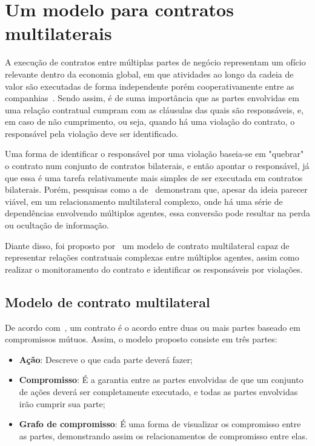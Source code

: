\section{Um modelo para contratos multilaterais} \label{sec:trab_contratos}

A execução de contratos entre múltiplas partes de negócio representam um ofício relevante dentro da economia global, em que atividades ao longo da cadeia de valor são executadas de forma independente porém cooperativamente entre as companhias~\cite{xu2004monitoring}. Sendo assim, é de suma importância que as partes envolvidas em uma relação contratual cumpram com as cláusulas das quais são responsáveis, e, em caso de não cumprimento, ou seja, quando há uma violação do contrato, o responsável pela violação deve ser identificado.

Uma forma de identificar o responsável por uma violação baseia-se em "quebrar" o contrato num conjunto de contratos bilaterais, e então apontar o responsável, já que essa é uma tarefa relativamente mais simples de ser executada em contratos bilaterais. Porém, pesquisas como a de~\citeauthor{haugen2002multi} demonstram que, apesar da ideia parecer viável, em um relacionamento multilateral complexo, onde há uma série de dependências envolvendo múltiplos agentes, essa conversão pode resultar na perda ou ocultação de informação.

Diante disso, foi proposto por~\citeauthor{xu2004multi} um modelo de contrato multilateral capaz de representar relações contratuais complexas entre múltiplos agentes, assim como realizar o monitoramento do contrato e identificar os responsáveis por violações.


\subsection*{Modelo de contrato multilateral}

De acordo com~\citeauthor{xu2004multi}, um contrato é o acordo entre duas ou mais partes baseado em compromissos mútuos. Assim, o modelo proposto consiste em três partes:
\begin{itemize}
	\item \textbf{Ação}: Descreve o que cada parte deverá fazer;
	\item \textbf{Compromisso}: É a garantia entre as partes envolvidas de que um conjunto de ações deverá ser completamente executado, e todas as partes envolvidas irão cumprir sua parte;
	\item \textbf{Grafo de compromisso}: É uma forma de visualizar os compromisso entre as partes, demonstrando assim os relacionamentos de compromisso entre elas.
\end{itemize}

